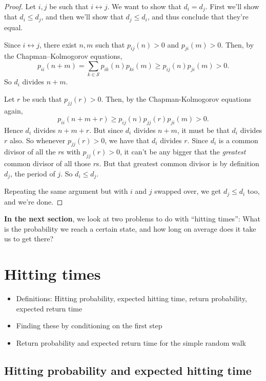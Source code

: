 \documentclass[
  a4paper,
]{article}
\providecommand{\tightlist}{%
  \setlength{\itemsep}{0pt}\setlength{\parskip}{0pt}}
\theoremstyle{definition}
\theoremstyle{definition}
\theoremstyle{definition}
\theoremstyle{remark}
\begin{document}
\begin{proof}

Let \(i,j\) be such that \(i \leftrightarrow j\). We want to show that \(d_i = d_j\). First we'll show that \(d_i \leq d_j\), and then we'll show that \(d_j \leq d_i\), and thus conclude that they're equal.

Since \(i\leftrightarrow j\), there exist \(n,m\) such that \(p_{ij}(n)>0\) and \(p_{ji}(m)>0\). Then, by the Chapman--Kolmogorov equations,
\[ p_{ii}(n+m) =  \sum_{k \in \mathcal S} p_{ik}(n) p_{ki}(m) \geq p_{ij}(n) p_{ji}(m) > 0 .  \]
So \(d_i\) divides \(n+m\).

Let \(r\) be such that \(p_{jj}(r)>0\). Then, by the Chapman-Kolmogorov equations again,
\[
    p_{ii}(n+m+r)\geq  p_{ij}(n) p_{jj}(r) p_{ji}(m) > 0.
    \]
Hence \(d_i\) divides \(n+m+r\). But since \(d_i\) divides \(n+m\), it must be that \(d_i\) divides \(r\) also. So whenever \(p_{jj}(r)>0\), we have that \(d_i\) divides \(r\). Since \(d_i\) is a common divisor of all the \(r\)s with \(p_{jj}(r)>0\), it can't be any bigger that the \emph{greatest} common divisor of all those \(r\)s. But that greatest common divisor is by definition \(d_j\), the period of \(j\). So \(d_i \leq d_j\).

Repeating the same argument but with \(i\) and \(j\) swapped over, we get \(d_j\leq d_i\) too, and we're done.

\end{proof}

\textbf{In the next section}, we look at two problems to do with ``hitting times'': What is the probability we reach a certain state, and how long on average does it take us to get there?

\hypertarget{S08-hitting-times}{%
\section{Hitting times}\label{S08-hitting-times}}

\begin{itemize}
\tightlist
\item
  Definitions: Hitting probability, expected hitting time, return probability, expected return time
\item
  Finding these by conditioning on the first step
\item
  Return probability and expected return time for the simple random walk
\end{itemize}

\hypertarget{hitting-definitions}{%
\subsection{Hitting probability and expected hitting time}\label{hitting-definitions}}
\end{document}

